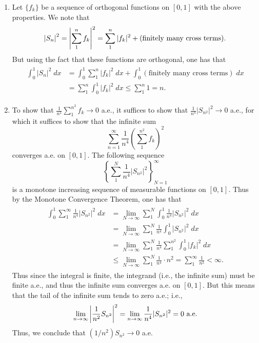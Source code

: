\documentclass{article}
\begin{document}
	\begin{enumerate}[itemsep =-2pt,label = (\alph{*})]
		\item Let $\{f_{k}\}$ be a sequence of orthogonal functions on $[0,1]$ with the above properties. We note that 
		\begin{equation*}
			\left| S_{n} \right|^{2} = \left| \sum_{1}^{n}f_{k} \right|^{2} = \sum_{1}^{n}|f_{k}|^{2} + (\text{finitely many cross terms}). 
		\end{equation*}
		But using the fact that these functions are orthogonal, one has that 
		\begin{align*}
			\begin{split}
				\int_{0}^{1}|S_{n}|^2\;dx &= \int_{0}^{1}\sum_{1}^{n}|f_{k}|^{2}\;dx + \int_{0}^{1}(\text{finitely many cross terms})\;dx \\
				&= \sum_{1}^{n}\int_{0}^{1}|f_{k}|^{2}\;dx \leq \sum_{1}^{n}1 = n. 
			\end{split}
		\end{align*}
		\item To show that $\frac{1}{n^2}\sum_{1}^{n^2}f_{k} \to 0$ a.e., it suffices to show that $\frac{1}{n^4}|S_{n^2}|^2 \to 0$ a.e., for which it suffices to show that the infinite sum 
		\begin{equation*}
			\sum_{n = 1}^{\infty}\frac{1}{n^{4}}\left(\sum_{1}^{n^{2}}f_{k}\right)^{2}
		\end{equation*}
		converges a.e. on $[0,1]$. The following sequence 
		\begin{equation*}
			\left\{\sum_{1}^{N}\frac{1}{n^{4}}|S_{n^{2}}|^{2}\right\}_{N = 1}^{\infty}
		\end{equation*}
		is a monotone increasing sequence of measurable functions on $[0,1]$. Thus by the Monotone Convergence Theorem, one has that 
		\begin{align*}
			\begin{split}
				\int_{0}^{1}\sum_{1}^{\infty}\frac{1}{n^{4}}|S_{n^{2}}|^{2}\;dx &= \lim_{N \to \infty}\sum_{1}^{N}\int_{0}^{1}\frac{1}{n^{4}}|S_{n^{2}}|^2\;dx \\
				&= \lim_{N \to \infty}\sum_{1}^{N}\frac{1}{n^{4}}\int_{0}^{1}|S_{n^2}|^2\;dx \\
				&= \lim_{N \to\infty}\sum_{1}^{N}\frac{1}{n^{4}}\sum_{1}^{n^{2}}\int_{0}^{1}|f_{k}|^{2}\;dx \\
				&\leq \lim_{N\to\infty}\sum_{1}^{N}\frac{1}{n^{4}} \cdot n^{2} = \sum_{1}^{\infty}\frac{1}{n^{2}} < \infty. 
			\end{split}
		\end{align*}
		Thus since the integral is finite, the integrand (i.e., the infinite sum) must be finite a.e., and thus the infinite sum converges a.e. on $[0,1]$. But this means that the tail of the infinite sum tends to zero a.e.; i.e., 
		\begin{equation*}
			\lim_{n \to \infty}\left| \frac{1}{n^{2}}S_{n^{2}} \right|^{2} = \lim_{n \to \infty}\frac{1}{n^{4}}|S_{n^{2}}|^{2} = 0 \text{ a.e.}
		\end{equation*}
		Thus, we conclude that $(1/n^2)S_{n^{2}} \to 0$ a.e. 
	\end{enumerate}
	
\end{document}
